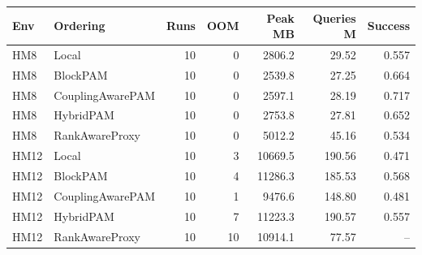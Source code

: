 \begin{tabular}{llrrrrr}
\toprule
Env & Ordering & Runs & OOM & Peak MB & Queries M & Success \\
\midrule
HM8 & Local & 10 & 0 & 2806.2 & 29.52 & 0.557 \\
HM8 & BlockPAM & 10 & 0 & 2539.8 & 27.25 & 0.664 \\
HM8 & CouplingAwarePAM & 10 & 0 & 2597.1 & 28.19 & 0.717 \\
HM8 & HybridPAM & 10 & 0 & 2753.8 & 27.81 & 0.652 \\
HM8 & RankAwareProxy & 10 & 0 & 5012.2 & 45.16 & 0.534 \\
\midrule
HM12 & Local & 10 & 3 & 10669.5 & 190.56 & 0.471 \\
HM12 & BlockPAM & 10 & 4 & 11286.3 & 185.53 & 0.568 \\
HM12 & CouplingAwarePAM & 10 & 1 & 9476.6 & 148.80 & 0.481 \\
HM12 & HybridPAM & 10 & 7 & 11223.3 & 190.57 & 0.557 \\
HM12 & RankAwareProxy & 10 & 10 & 10914.1 & 77.57 & -- \\
\bottomrule
\end{tabular}
